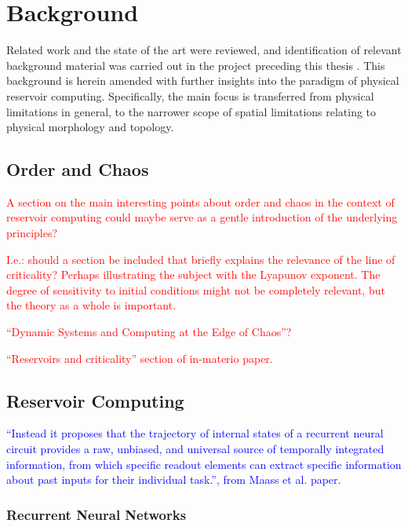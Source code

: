 \chapter{Background}

Related work and the state of the art were reviewed, and identification of
relevant background material was carried out in the project preceding this
thesis \cite{aven_exploring_2019}. This background is herein amended with
further insights into the paradigm of physical reservoir
computing. Specifically, the main focus is transferred from physical limitations
in general, to the narrower scope of spatial limitations relating to physical
morphology and topology.

\section{Order and Chaos}

\textcolor{red}{
  A section on the main interesting points about order and chaos in the context
of reservoir computing could maybe serve as a gentle introduction of the
underlying principles?
}

\textcolor{red}{
  I.e.: should a section be included that briefly explains the relevance of the
line of criticality? Perhaps illustrating the subject with the Lyapunov
exponent. The degree of sensitivity to initial conditions might not be
completely relevant, but the theory as a whole is important.
}

\textcolor{red}{
  ``Dynamic Systems and Computing at the Edge of Chaos''?
}

\textcolor{red}{
  ``Reservoirs and criticality'' section of in-materio paper.
}

\section{Reservoir Computing}

\textcolor{blue}{
  ``Instead it proposes that the trajectory of internal states of a recurrent
neural circuit provides a raw, unbiased, and universal source of temporally
integrated information, from which specific readout elements can extract
specific information about past inputs for their individual task.'', from Maass
et al. paper.
}

\subsection{Recurrent Neural Networks}

